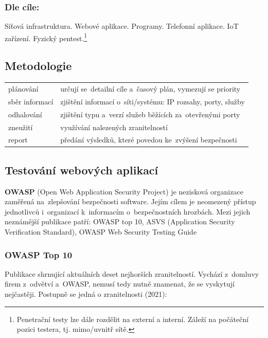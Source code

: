 \subsubsection*{Dle cíle:}

Síťová infrastruktura. Webové aplikace. Programy. Telefonní aplikace. IoT zařízení. Fyzický pentest.\footnote{Penetrační testy lze dále rozdělit na externí a interní. Záleží na počáteční pozici testera, tj. mimo/uvnitř sítě.}

\subsection{Metodologie}

\begin{table}[h]
    \centering
    \begin{tabular}{p{3cm}|p{12cm}}
        plánování      & určují se~detailní cíle a~časový plán, vymezují se priority  \\
        sběr informací & zjištění informací o~síti/systému: IP rozsahy, porty, služby \\
        odhalování     & zjištění typu a~verzí služeb běžících za~otevřenými porty    \\
        zneužití       & využívání nalezených zranitelností                           \\
        report         & předání výsledků, které povedou ke~zvýšení bezpečnosti       \\
    \end{tabular}
\end{table}

\subsection{Testování webových aplikací}

\textbf{OWASP} (Open Web Application Security Project) je nezisková organizace zaměřená na~zlepšování bezpečnosti software. Jejím cílem je neomezený přístup jednotlivců i~organizací k~informacím o~bezpečnostních hrozbách. Mezi jejich neznámější publikace patří: OWASP top 10, ASVS (Application Security Verification Standard), OWASP Web Security Testing Guide

\subsubsection{OWASP Top 10}

Publikace shrnující aktuálních deset nejhorších zranitelností. Vychází z~domluvy firem z~odvětví a~OWASP, nemusí tedy nutně znamenat, že se vyskytují nejčastěji. Postupně se jedná o zranitelnosti (2021):

